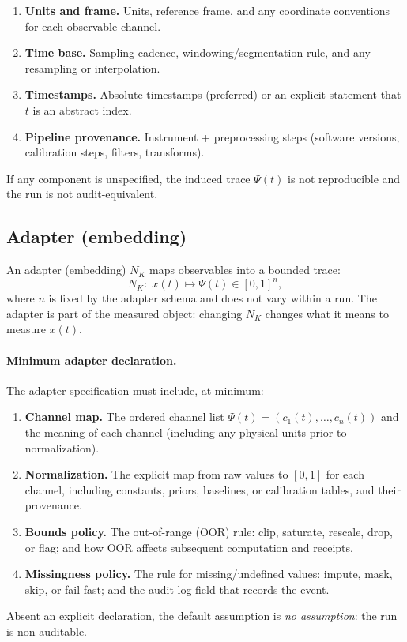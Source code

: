 \documentclass[
  aps,
  prd,
  preprint,
  superscriptaddress,
  nofootinbib,
  floatfix
]{revtex4-2}
\begin{document}
\begin{enumerate}[leftmargin=2.1em]
  \item \textbf{Units and frame.} Units, reference frame, and any coordinate conventions for each observable channel.
  \item \textbf{Time base.} Sampling cadence, windowing/segmentation rule, and any resampling or interpolation.
  \item \textbf{Timestamps.} Absolute timestamps (preferred) or an explicit statement that $t$ is an abstract index.
  \item \textbf{Pipeline provenance.} Instrument + preprocessing steps (software versions, calibration steps, filters, transforms).
\end{enumerate}

If any component is unspecified, the induced trace $\Psi(t)$ is not reproducible and the run is not audit-equivalent.

\subsection{Adapter (embedding)}
An adapter (embedding) $N_K$ maps observables into a bounded trace:
\begin{equation}
  N_K:\; x(t)\mapsto \Psi(t)\in[0,1]^n,
\end{equation}
where $n$ is fixed by the adapter schema and does not vary within a run.
The adapter is part of the measured object: changing $N_K$ changes what it means to measure $x(t)$.

\paragraph{Minimum adapter declaration.}
The adapter specification must include, at minimum:
\begin{enumerate}[leftmargin=2.1em]
  \item \textbf{Channel map.} The ordered channel list $\Psi(t)=(c_1(t),\dots,c_n(t))$ and the meaning of each channel
  (including any physical units prior to normalization).
  \item \textbf{Normalization.} The explicit map from raw values to $[0,1]$ for each channel, including constants, priors,
  baselines, or calibration tables, and their provenance.
  \item \textbf{Bounds policy.} The out-of-range (OOR) rule: clip, saturate, rescale, drop, or flag; and how OOR affects
  subsequent computation and receipts.
  \item \textbf{Missingness policy.} The rule for missing/undefined values: impute, mask, skip, or fail-fast; and the
  audit log field that records the event.
\end{enumerate}
Absent an explicit declaration, the default assumption is \emph{no assumption}: the run is non-auditable.
\end{document}
